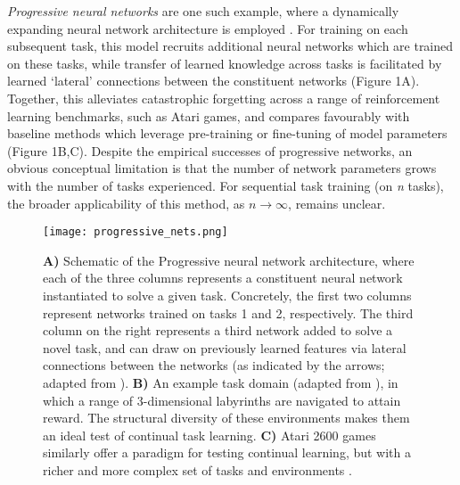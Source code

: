 \documentclass{article} %
\begin{document}
\textit{Progressive neural networks} are one such example, where a dynamically expanding neural network architecture is employed \citep{rusu2016progressive}. For training on each subsequent task, this model recruits additional neural networks which are trained on these tasks, while transfer of learned knowledge across tasks is facilitated by learned ‘lateral’ connections between the constituent networks (Figure 1A). Together, this alleviates catastrophic forgetting across a range of reinforcement learning benchmarks, such as Atari games, and compares favourably with baseline methods which leverage pre-training or fine-tuning of model parameters (Figure 1B,C). Despite the empirical successes of progressive networks, an obvious conceptual limitation is that the number of network parameters grows with the number of tasks experienced. For sequential task training (on \textit{n} tasks), the broader applicability of this method, as $n\to\infty$, remains unclear.

\begin{figure}[h]
\texttt{[image: progressive\_nets.png]}
\caption{\textbf{A)} Schematic of the Progressive neural network architecture, where each of the three columns represents a constituent neural network instantiated to solve a given task. Concretely, the first two columns represent networks trained on tasks 1 and 2, respectively. The third column on the right represents a third network added to solve a novel task, and can draw on previously learned features via lateral connections between the networks (as indicated by the arrows; adapted from \citep{rusu2016progressive}). \textbf{B)} An example task domain (adapted from \citet{rusu2016progressive}), in which a range of 3-dimensional labyrinths are navigated to attain reward. The structural diversity of these environments makes them an ideal test of continual task learning. \textbf{C)} Atari 2600 games similarly offer a paradigm for testing continual learning, but with a richer and more complex set of tasks and environments \citep{rusu2016progressive}. }
\end{figure}
\end{document}
